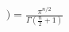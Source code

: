 \documentclass[preview]{standalone}
\begin{document}
\begin{align*}
) = \frac{\pi^{n/2}}{\Gamma(\frac{n}{2} + 1)}
\end{align*}
\end{document}
